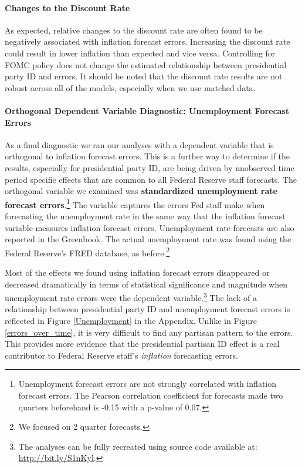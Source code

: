 \documentclass[a4paper]{article}\usepackage{graphicx, color}
\begin{document}
\paragraph{Changes to the Discount Rate}

As expected, relative changes to the discount rate are often found to be negatively associated with inflation forecast errors. Increasing the discount rate could result in lower inflation than expected and vice versa. Controlling for FOMC policy does not change the estimated relationship between presidential party ID and errors. It should be noted that the discount rate results are not robust across all of the models, especially when we use matched data. 




\paragraph{Orthogonal Dependent Variable Diagnostic: Unemployment Forecast Errors}

As a final diagnostic we ran our analyses with a dependent variable that is orthogonal to inflation forecast errors. This is a further way to determine if the results, especially for presidential party ID, are being driven by unobserved time period specific effects that are common to all Federal Reserve staff forecasts. The orthogonal variable we examined was {\bf{standardized unemployment rate forecast errors}}.\footnote{Unemployment forecast errors are not strongly correlated with inflation forecast errors. The Pearson correlation coefficient for forecasts made two quarters beforehand is -0.15 with a p-value of 0.07.} The variable captures the errors Fed staff make when forecasting the unemployment rate in the same way that the inflation forecast variable measures inflation forecast errors. Unemployment rate forecasts are also reported in the Greenbook. The actual unemployment rate was found using the Federal Reserve's FRED database, as before.\footnote{We focused on 2 quarter forecasts.}

Most of the effects we found using inflation forecast errors disappeared or decreased dramatically in terms of statistical significance and magnitude when unemployment rate errors were the dependent variable.\footnote{The analyses can be fully recreated using source code available at: \url{http://bit.ly/S1nKyl}.} The lack of a relationship between presidential party ID and unemployment forecast errors is reflected in Figure \ref{Unemployment} in the Appendix. Unlike in Figure \ref{errors_over_time}, it is very difficult to find any partisan pattern to the errors. This provides more evidence that the presidential partisan ID effect is a real contributor to Federal Reserve staff's \emph{inflation} forecasting errors.
\end{document}
